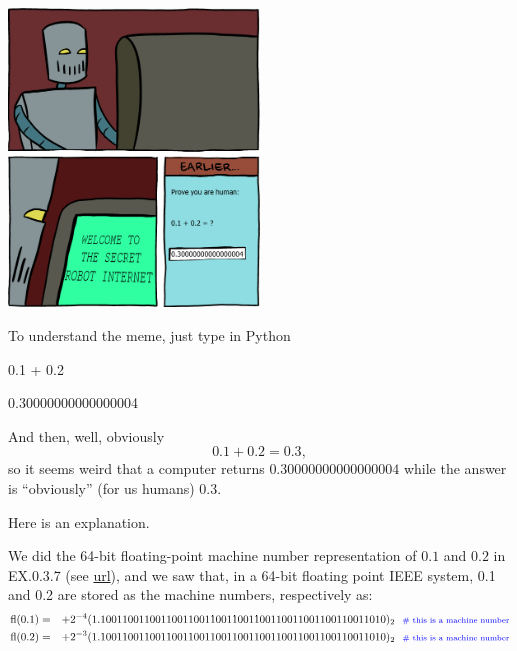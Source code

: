 \documentclass[pdftex,11pt]{article}
\begin{document}
\thispagestyle{empty}
\pagestyle{empty}
\renewcommand{\theenumi}{\alph{enumi}}

\begin{center}
\includegraphics[width=0.5\textwidth]{meme_0_3.jpeg}
\end{center}

\vspace*{.7cm}

\vspace*{.2cm}


To understand the meme, just type in Python

\begin{python}
0.1 + 0.2
\end{python}
\begin{pythonoutput}
0.30000000000000004
\end{pythonoutput}

And then, well, obviously $$0.1+0.2 = 0.3,$$ so it seems weird that a computer returns 
$0.30000000000000004$ while the answer is ``obviously'' (for us humans) $0.3$.\\


\vspace*{.2cm}

Here is an explanation. 

We did the 64-bit floating-point machine number representation of $0.1$ and $0.2$ in EX.0.3.7 
(see \href{http://math.ucdenver.edu/~langou/4650/0.3/exercise_ex_0_3_07________sauer____sol_langou/exercise_ex_0_3_07________sauer____sol_langou.pdf}{url}), 
and we saw that, in a 64-bit floating point IEEE system, 0.1 and 0.2 are stored
as the machine numbers, respectively as: 
\begin{eqnarray}
 \nonumber \textmd{fl}(0.1)       & = &  + 2^{-4} ( 1.1001100110011001100110011001100110011001100110011010)_2~~\textmd{\scriptsize\color{blue}\# this is a machine number}\\
 \nonumber \textmd{fl}(0.2)       & = &  + 2^{-3} ( 1.1001100110011001100110011001100110011001100110011010)_2~~\textmd{\scriptsize\color{blue}\# this is a machine number}
\end{eqnarray}
\end{document}
